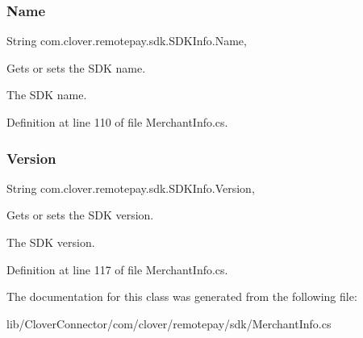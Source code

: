 \subsubsection{\texorpdfstring{Name}{Name}}
{\footnotesize\ttfamily String com.\+clover.\+remotepay.\+sdk.\+S\+D\+K\+Info.\+Name\hspace{0.3cm}{\ttfamily [get]}, {\ttfamily [set]}}



Gets or sets the S\+DK name. 

The S\+DK name. 

Definition at line 110 of file Merchant\+Info.\+cs.

\mbox{\label{classcom_1_1clover_1_1remotepay_1_1sdk_1_1_s_d_k_info_a48f760a4186c72115f1e00bc4446ce09}} 
\subsubsection{\texorpdfstring{Version}{Version}}
{\footnotesize\ttfamily String com.\+clover.\+remotepay.\+sdk.\+S\+D\+K\+Info.\+Version\hspace{0.3cm}{\ttfamily [get]}, {\ttfamily [set]}}



Gets or sets the S\+DK version. 

The S\+DK version. 

Definition at line 117 of file Merchant\+Info.\+cs.



The documentation for this class was generated from the following file\+:\begin{DoxyCompactItemize}
\item 
lib/\+Clover\+Connector/com/clover/remotepay/sdk/Merchant\+Info.\+cs\end{DoxyCompactItemize}
